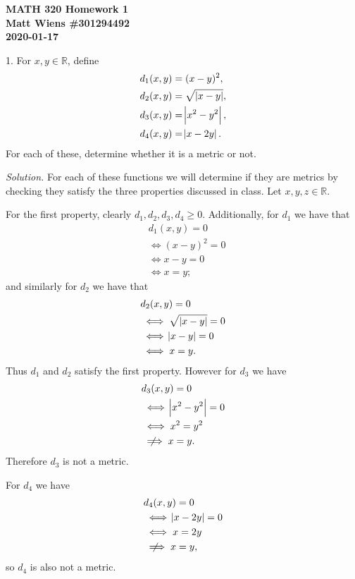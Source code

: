\documentclass{article}
\newcommand{\R}{\mathbb{R}}
\newcommand{\notimplies}{%
      \mathrel{{\ooalign{\hidewidth$\not\phantom{=}$\hidewidth\cr$\implies$}}}}
\begin{document}
\textbf{MATH 320 Homework 1} \\
\textbf{Matt Wiens \#301294492} \\
\textbf{2020-01-17}

1. For $x, y \in \R$, define
%
\begin{align}
    d_1(x, y) &= (x - y)^2,
    \label{eq:q1-1} \\
    d_2(x, y) &= \sqrt{\, \envert{x - y}},
    \label{eq:q1-2} \\
    d_3(x, y) &= \envert{x^2 - y^2},
    \label{eq:q1-3} \\
    d_4(x, y) &= \envert{x - 2 y}.
    \label{eq:q1-4}
\end{align}
%
For each of these, determine whether it is a metric or not.

\textit{Solution.}
For each of these functions we will determine if they are metrics  by
checking they satisfy the three properties discussed in class. Let $x,
y, z \in \R$.

For the first property, clearly $d_1, d_2, d_3, d_4 \geq 0$.
Additionally, for $d_1$ we have that
%
\begin{align*}
    &d_1(x, y) = 0 \\
    &\iff (x - y)^2 = 0 \\
    &\iff x - y = 0 \\
    &\iff x = y
    ;
\end{align*}
%
and similarly for $d_2$ we have that
%
\begin{align*}
    &d_2(x, y) = 0 \\
    &\iff \sqrt{\, \envert{x - y}} = 0 \\
    &\iff \envert{x - y} = 0 \\
    &\iff x = y
    .
\end{align*}
%
Thus $d_1$ and $d_2$ satisfy the first property. However for $d_3$ we
have
%
\begin{align*}
    &d_3(x, y) = 0 \\
    &\iff \envert{x^2 - y^2} = 0 \\
    &\iff x^2 = y^2 \\
    &\notimplies x = y
    .
\end{align*}
%
Therefore $d_3$ is not a metric.

For $d_4$ we have
%
\begin{align*}
    &d_4(x, y) = 0 \\
    &\iff \envert{x - 2 y} = 0 \\
    &\iff x = 2 y \\
    &\notimplies x = y
    ,
\end{align*}
%
so $d_4$ is also not a metric.
\end{document}
